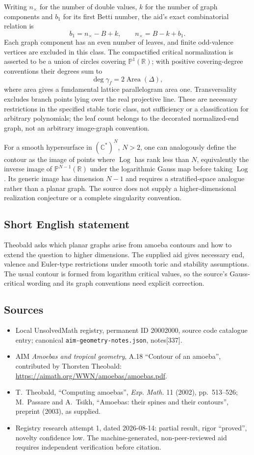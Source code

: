 \documentclass[11pt]{article}
\newcommand{\R}{\mathbb{R}}
\newcommand{\C}{\mathbb{C}}
\newcommand{\PP}{\mathbb{P}}
\begin{document}
Writing $n_\times$ for the number of double values, $k$ for the number of graph components and $b_1$ for its first Betti number, the aid's exact combinatorial relation is
\[
 b_1=n_\times-B+k,
 \qquad n_\times=B-k+b_1.
\]
Each graph component has an even number of leaves, and finite odd-valence vertices are excluded in this class. The compactified critical normalization is asserted to be a union of circles covering $\PP^1(\R)$; with positive covering-degree conventions their degrees sum to
\[
 \deg\gamma_f=2\operatorname{Area}(\Delta),
\]
where area gives a fundamental lattice parallelogram area one. Transversality excludes branch points lying over the real projective line. These are necessary restrictions in the specified stable toric class, not sufficiency or a classification for arbitrary polynomials; the leaf count belongs to the decorated normalized-end graph, not an arbitrary image-graph convention.

For a smooth hypersurface in $(\C^*)^N$, $N>2$, one can analogously define the contour as the image of points where $\operatorname{Log}$ has rank less than $N$, equivalently the inverse image of $\PP^{N-1}(\R)$ under the logarithmic Gauss map before taking $\operatorname{Log}$. Its generic image has dimension $N-1$ and requires a stratified-space analogue rather than a planar graph. The source does not supply a higher-dimensional realization conjecture or a complete singularity convention.
\subsection{Short English statement}
Theobald asks which planar graphs arise from amoeba contours and how to extend the question to higher dimensions. The supplied aid gives necessary end, valence and Euler-type restrictions under smooth toric and stability assumptions. The usual contour is formed from logarithm critical values, so the source's Gauss-critical wording and its graph conventions need explicit correction.
\subsection{Sources}
\begin{itemize}
\item Local UnsolvedMath registry, permanent ID 20002000, source code catalogue entry; canonical \texttt{aim-geometry-notes.json}, notes[337].
\item AIM \emph{Amoebas and tropical geometry}, A.18 ``Contour of an amoeba'', contributed by Thorsten Theobald: \url{https://aimath.org/WWN/amoebas/amoebas.pdf}.
\item T.~Theobald, ``Computing amoebas'', \emph{Exp. Math.} 11 (2002), pp.~513--526; M.~Passare and A.~Tsikh, ``Amoebas: their spines and their contours'', preprint (2003), as supplied.
\item Registry research attempt 1, dated 2026-08-14: partial result, rigor ``proved'', novelty confidence low. The machine-generated, non-peer-reviewed aid requires independent verification before citation.
\end{itemize}
\end{document}
